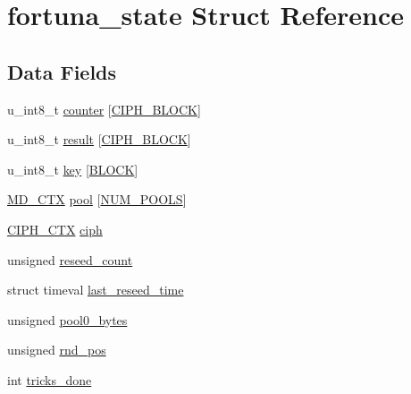 \hypertarget{structfortuna__state}{}\section{fortuna\+\_\+state Struct Reference}
\label{structfortuna__state}
\subsection*{Data Fields}
\begin{DoxyCompactItemize}
\item 
u\+\_\+int8\+\_\+t \mbox{\hyperlink{structfortuna__state_a38b2a1c6f2c07ca184a097715cc3f7dc}{counter}} \mbox{[}\mbox{\hyperlink{fortuna_8c_a9fe77c3b0290638cb826d1d21ea089f2}{C\+I\+P\+H\+\_\+\+B\+L\+O\+CK}}\mbox{]}
\item 
u\+\_\+int8\+\_\+t \mbox{\hyperlink{structfortuna__state_af2a7af6c223b8d202715d133467d50ce}{result}} \mbox{[}\mbox{\hyperlink{fortuna_8c_a9fe77c3b0290638cb826d1d21ea089f2}{C\+I\+P\+H\+\_\+\+B\+L\+O\+CK}}\mbox{]}
\item 
u\+\_\+int8\+\_\+t \mbox{\hyperlink{structfortuna__state_aef8cbfe98b980bba6514a6fe12b8f8ac}{key}} \mbox{[}\mbox{\hyperlink{fortuna_8c_a52220397ecea855b3a99746e451426e1}{B\+L\+O\+CK}}\mbox{]}
\item 
\mbox{\hyperlink{fortuna_8c_a048bfa4110aab2baeb19226a65ac2d65}{M\+D\+\_\+\+C\+TX}} \mbox{\hyperlink{structfortuna__state_a53d7ea36f61adaa577f1328071abc3e8}{pool}} \mbox{[}\mbox{\hyperlink{fortuna_8c_a2c5a4c46ba326a907d016cc28654e39e}{N\+U\+M\+\_\+\+P\+O\+O\+LS}}\mbox{]}
\item 
\mbox{\hyperlink{fortuna_8c_af34e82ca14c1a5b3552ff1f386b66e18}{C\+I\+P\+H\+\_\+\+C\+TX}} \mbox{\hyperlink{structfortuna__state_a95ce19ebcf8f4b5194747800cda1c30c}{ciph}}
\item 
unsigned \mbox{\hyperlink{structfortuna__state_aa8237da33b2f2838320097ed06837879}{reseed\+\_\+count}}
\item 
struct timeval \mbox{\hyperlink{structfortuna__state_a6d4e1a0a714f4826e1ac2568ef39362c}{last\+\_\+reseed\+\_\+time}}
\item 
unsigned \mbox{\hyperlink{structfortuna__state_aaf71b2ed6c86a11f8abbe5ee3277c4a5}{pool0\+\_\+bytes}}
\item 
unsigned \mbox{\hyperlink{structfortuna__state_a6b390be97975dff29c08c06ecf1bdb3a}{rnd\+\_\+pos}}
\item 
int \mbox{\hyperlink{structfortuna__state_a4ea7c5da5396b8f797f36993a98de5fe}{tricks\+\_\+done}}
\end{DoxyCompactItemize}



